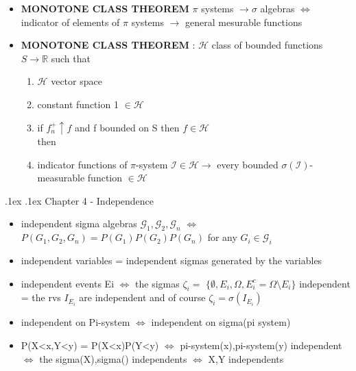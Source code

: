 \documentclass[10pt,landscape,a4paper]{article}
\makeatletter
\renewcommand{\section}{\@startsection{section}{1}{0mm}%
                                {.1ex}%
                                {.1ex}%
                                {\color{blue}\sffamily\small\bfseries}}
\makeatother
\begin{document}
\begin{multicols*}{3}
\begin{spacing}{0.5}
\begin{itemize}
\item \textbf{MONOTONE CLASS THEOREM} $\pi$ systems $\rightarrow \sigma$ algebras $\Leftrightarrow$ indicator of elements of $\pi$ systems $\rightarrow$ general mesurable functions

\item \textbf{MONOTONE CLASS THEOREM} : $\mathcal{H}$ class of bounded functions $S \rightarrow \mathbb{R}$ such that 
\begin{enumerate}
\item $\mathcal{H}$ vector space
\item constant function 1 $\in \mathcal{H}$
\item if $f_n^+ \uparrow f$ and f bounded on S then $f \in \mathcal{H}$
\\then
\item indicator functions of $\pi$-system $ \mathcal{I} \in \mathcal{H} \rightarrow$ every bounded $\sigma ( \mathcal{I} )$-measurable function $\in \mathcal{H}$

\end{enumerate}

\end{itemize}

\section{Chapter 4 - Independence}



\begin{itemize} 

\item independent sigma algebras $\mathcal{G}_1,\mathcal{G}_2,\mathcal{G}_n$ $\Leftrightarrow$ $P(G_1,G_2,G_n)=P(G_1)P(G_2)P(G_n)$ for any $G_i \in \mathcal{G}_i$

\item independent variables = independent sigmas generated by the variables

\item independent events Ei $\Leftrightarrow$ the sigmas $\zeta_i=$ $\{\emptyset,E_i,\Omega,E_i^c=\Omega \setminus E_i\}$ independent = the rvs $I_{E_i}$ are independent and of course $\zeta_i=\sigma(I_{E_i})$
\item independent on Pi-system $\Leftrightarrow$ independent on sigma(pi system)

\item P(X<x,Y<y) = P(X<x)P(Y<y) $\Leftrightarrow$ pi-system(x),pi-system(y) independent $\Leftrightarrow$ the sigma(X),sigma() independents $\Leftrightarrow$ X,Y independents


\end{itemize}
\end{spacing}
\end{multicols*}
\end{document}
